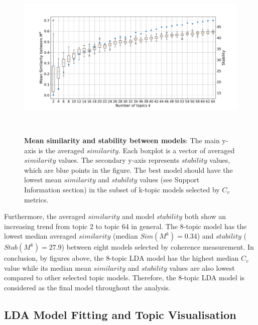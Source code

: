\begin{figure}[H]
    \centering
    \includegraphics[width = 16cm, height = 8cm]{./img/jsd_boxplot.pdf}
    \caption[Mean similarity and stability between models]{\textbf{Mean similarity and stability between models}: The main y-axis is the averaged $similarity$. Each boxplot is a vector of averaged $similarity$ values. The secondary y-axis represents $stability$ values, which are blue points in the figure. The best model should have the lowest mean $similarity$ and $stability$ values (see Support Information section) in the subset of k-topic models selected by $C_v$ metrics.}
\end{figure}

Furthermore, the averaged $similarity$ and model $stability$ both show an increasing trend from topic 2 to topic 64 in general. The 8-topic model has the lowest median averaged $similarity$ (median $Sim(M^k) = 0.34$) and $stability$ ($Stab(M^k) = 27.9$) between eight models selected by coherence measurement. In conclusion, by figures above, the 8-topic LDA model has the highest median $C_v$ value while its median mean $similarity$ and $stability$ values are also lowest compared to other selected topic models. Therefore, the 8-topic LDA model is considered as the final model throughout the analysis.

\subsection{LDA Model Fitting and Topic Visualisation}

